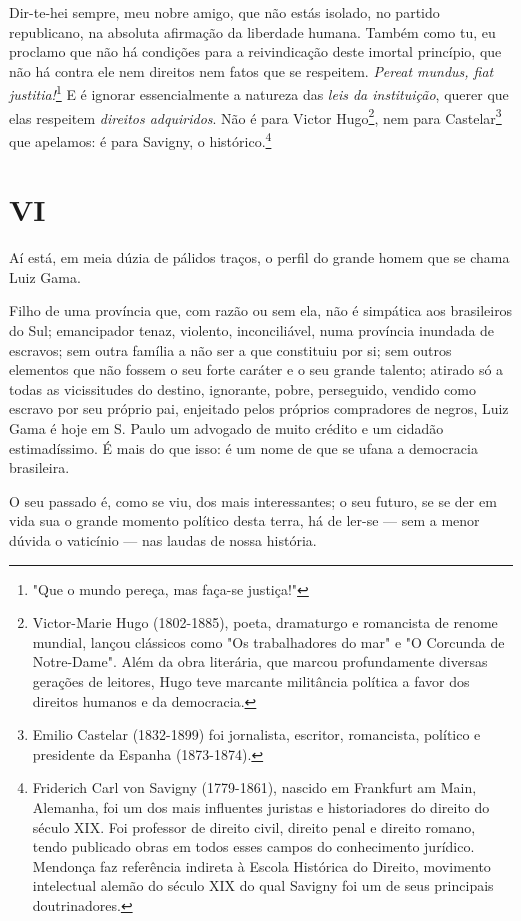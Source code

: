 Dir-te-hei sempre, meu nobre amigo, que não estás isolado, no partido
republicano, na absoluta afirmação da liberdade humana. Também como tu,
eu proclamo que não há condições para a reivindicação deste imortal
princípio, que não há contra ele nem direitos nem fatos que se
respeitem. \emph{Pereat mundus, fiat justitia!}\footnote{"Que o mundo
  pereça, mas faça-se justiça!"} E é ignorar essencialmente a natureza
das \emph{leis da instituição}, querer que elas respeitem \emph{direitos
adquiridos}. Não é para Victor Hugo\footnote{Victor-Marie Hugo
  (1802-1885), poeta, dramaturgo e romancista de renome mundial, lançou
  clássicos como "Os trabalhadores do mar" e "O Corcunda de Notre-Dame".
  Além da obra literária, que marcou profundamente diversas gerações de
  leitores, Hugo teve marcante militância política a favor dos direitos
  humanos e da democracia.}, nem para Castelar\footnote{Emilio
  Castelar (1832-1899) foi jornalista, escritor, romancista, político e
  presidente da Espanha (1873-1874).} que apelamos: é para Savigny, o
histórico.\footnote{Friderich Carl von Savigny (1779-1861), nascido em
  Frankfurt am Main, Alemanha, foi um dos mais influentes juristas e
  historiadores do direito do século XIX. Foi professor de direito
  civil, direito penal e direito romano, tendo publicado obras em todos
  esses campos do conhecimento jurídico. Mendonça faz referência
  indireta à Escola Histórica do Direito, movimento intelectual alemão
  do século XIX do qual Savigny foi um de seus principais doutrinadores.}

\section*{VI}

Aí está, em meia dúzia de pálidos traços, o perfil do grande homem que
se chama Luiz Gama.

Filho de uma província que, com razão ou sem ela, não é simpática aos
brasileiros do Sul; emancipador tenaz, violento, inconciliável, numa
província inundada de escravos; sem outra família a não ser a que
constituiu por si; sem outros elementos que não fossem o seu forte
caráter e o seu grande talento; atirado só a todas as vicissitudes do
destino, ignorante, pobre, perseguido, vendido como escravo por seu
próprio pai, enjeitado pelos próprios compradores de negros, Luiz Gama é
hoje em S. Paulo um advogado de muito crédito e um cidadão
estimadíssimo. É mais do que isso: é um nome de que se ufana a
democracia brasileira.

O seu passado é, como se viu, dos mais interessantes; o seu futuro, se
se der em vida sua o grande momento político desta terra, há de ler-se
--- sem a menor dúvida o vaticínio --- nas laudas de nossa história.

